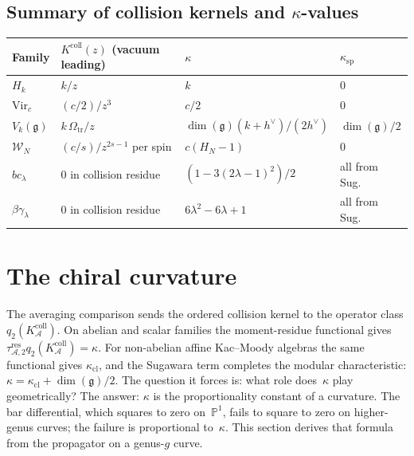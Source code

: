 \documentclass[11pt,reqno]{amsart}
\theoremstyle{definition}
\theoremstyle{remark}
\newcommand{\cA}{\mathcal{A}}
\newcommand{\cW}{\mathcal{W}}
\newcommand{\fg}{\mathfrak{g}}
\newcommand{\Vir}{\mathrm{Vir}}
\numberwithin{equation}{section}
\begin{document}
\subsection{Summary of collision kernels and $\kappa$-values}
\label{subsec:summary-table}

\begin{center}
\begin{tabular}{@{}llll@{}}
\toprule
Family & $K^{\mathrm{coll}}(z)$ (vacuum leading) & $\kappa$ &
$\kappa_{\mathrm{sp}}$ \\
\midrule
$H_k$ & $k/z$ & $k$ & $0$ \\
$\Vir_c$ & $(c/2)/z^3$ & $c/2$ & $0$ \\
$V_k(\fg)$ & $k\,\Omega_{\mathrm{tr}}/z$ &
 $\dim(\fg)(k{+}h^\vee)/(2h^\vee)$ & $\dim(\fg)/2$ \\
$\cW_N$ & $(c/s)/z^{2s-1}$ per spin & $c(H_N{-}1)$ & $0$ \\
$bc_\lambda$ & $0$ in collision residue &
 $(1{-}3(2\lambda{-}1)^2)/2$ & all from Sug. \\
$\beta\gamma_\lambda$ & $0$ in collision residue &
 $6\lambda^2{-}6\lambda{+}1$ & all from Sug. \\
\bottomrule
\end{tabular}
\end{center}


\section{The chiral curvature}\label{sec:chiral-cw}

The averaging comparison sends the ordered collision kernel to the
operator class $q_2(K_\cA^{\mathrm{coll}})$.  On abelian and scalar
families the moment-residue functional gives
$\tau_{\cA,2}^{\mathrm{res}}q_2(K_\cA^{\mathrm{coll}})=\kappa$.
For non-abelian affine Kac--Moody algebras the same functional gives
$\kappa_{\mathrm{cl}}$, and the Sugawara term completes the modular
characteristic:
$\kappa=\kappa_{\mathrm{cl}}+\dim(\fg)/2$.
The question it forces is: what role does~$\kappa$ play
geometrically? The answer: $\kappa$ is the proportionality
constant of a curvature. The bar differential, which squares
to zero on~$\mathbb{P}^1$, fails to square to zero on
higher-genus curves; the failure is proportional to~$\kappa$.
This section derives that formula from the propagator on a
genus-$g$ curve.
\end{document}
